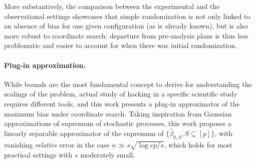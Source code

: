 More substantively, the comparison between the experimental and the observational settings showcases that simple randomization is not only linked to an absence of bias for one given configuration (as is already known), but is also more robust to coordinate search: departure from pre-analysis plans is thus less problematic and easier to account for when there was initial randomization. 


\paragraph{Plug-in approximation.} While bounds are the most fundamental concept to derive for understanding the scalings of the problem, actual study of hacking in a specific scientific study requires different tools, and this work presents a plug-in approximator of the maximum bias under coordinate search.  Taking inspiration from Gaussian approximations of supremum of stochastic processes, this work proposes a linearly separable approximator of the supremum of $\{\hat \beta_{0, S}, S\subseteq [p]\}$, with vanishing \textit{relative} error in the case $n \gg s \sqrt{\log e p /s}$, which holds for most practical settings with $s$ moderately small. 

